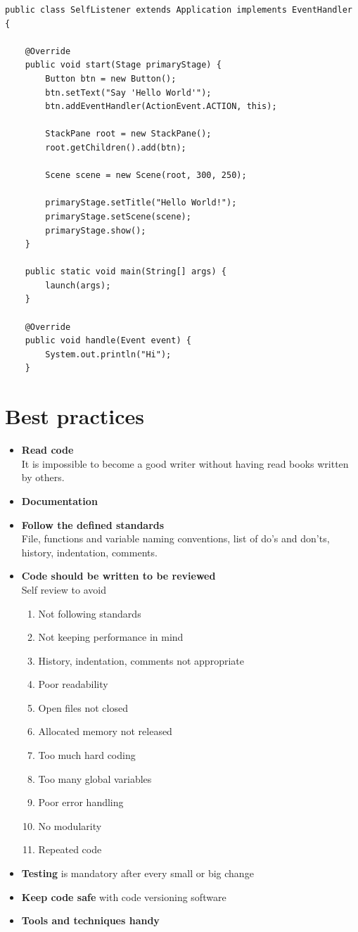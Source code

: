 \documentclass[10pt,a4paper]{book}
\begin{document}
\begin{verbatim}
public class SelfListener extends Application implements EventHandler {
    
    @Override
    public void start(Stage primaryStage) {
        Button btn = new Button();
        btn.setText("Say 'Hello World'");
        btn.addEventHandler(ActionEvent.ACTION, this);

        StackPane root = new StackPane();
        root.getChildren().add(btn);
        
        Scene scene = new Scene(root, 300, 250);
        
        primaryStage.setTitle("Hello World!");
        primaryStage.setScene(scene);
        primaryStage.show();
    }

    public static void main(String[] args) {
        launch(args);
    }

    @Override
    public void handle(Event event) {
        System.out.println("Hi");
    }

\end{verbatim}
\newpage
\section{Best practices}
\begin{itemize}
\item {\bf Read code}\\
It is impossible to become a good writer without having read books written by others.
\item \textbf{Documentation}
\item \textbf{Follow the defined standards}\\
File, functions and variable naming conventions, list of do's and don'ts, history, indentation, comments.
\item \textbf{Code should be written to be reviewed}\\
Self review to avoid
\begin{enumerate}
\item Not following standards
\item Not keeping performance in mind
\item History, indentation, comments not appropriate
\item Poor readability
\item Open files not closed
\item Allocated memory not released
\item Too much hard coding
\item Too many global variables
\item Poor error handling
\item No modularity
\item Repeated code
\end{enumerate}
\item \textbf{Testing} is mandatory after every small or big change
\item \textbf{Keep code safe} with code versioning software
\item \textbf{Tools and techniques handy}
\end{itemize}
\end{document}

